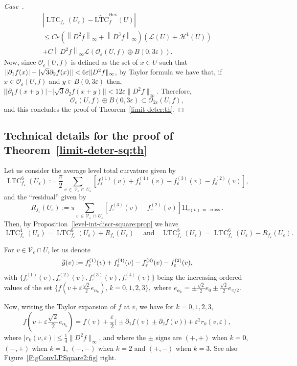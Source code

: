 \documentclass[AHL,Unicode,longabstracts,published]{cedram}
\newcommand{\ind}{{1\!\!\mathrm{I}}}
\newcommand{\eps}{\varepsilon}
\DeclareMathOperator{\LTC}{LTC}
\DeclareMathOperator{\Hex}{Hex}
\DeclareMathOperator{\cross}{cross}
\newcommand{\tLTC}{\widetilde{\mathrm{LTC}}}
\newcommand{\calH}{\mathcal{H}}
\newcommand{\calL}{\mathcal{L}}
\newcommand{\calV}{\mathcal{V}}
\newcommand{\calO}{\mathcal{O}}
\newcounter{casecount}
\newenvironment{lastcase}{\refstepcounter{casecount}\begin{proof}[Case~\thecasecount]}{\end{proof}}
\let\oldtilde\tilde
\renewcommand*{\tilde}[1]{\mathchoice{\widetilde{#1}}{\widetilde{#1}}{\oldtilde{#1}}{\oldtilde{#1}}}
\begin{document}
\begin{lastcase}
\begin{multline*}
\left|\LTC_{f_\eps}(U_\eps)-\tLTC_{f}^{\Hex}(U)\right|
\\
\le C\eps
\left(\left\|D^2f\right\|_\infty+\left\|D^3f\right\|_\infty\right)\left(\calL(U)+\calH^1(U)\right)\\+ C \left\|D^2f\right\|_\infty \calL\left(\calO_{\eps} (U,f)\oplus B(0,3\eps)\right).
\end{multline*}
Now, since ${\calO}_{\eps} (U,f)$ is defined as the set of $x\in U$ such that $| |\partial_1f(x)|-|\sqrt{3}\partial_2f(x)| | \linebreak <6\eps\|D^2 f\|_\infty$, by Taylor formula we have that, if $x\in {\calO}_{\eps} (U,f)$ and $y\in B(0,3\eps)$ then, $| |\partial_1f(x+y)|-|\sqrt{3}\partial_2f(x+y)| | <12\eps\|D^2 f\|_\infty$. Therefore,
\[
{\calO}_{\eps} (U,f) \oplus B(0,3\eps) \subset {\calO}_{2\eps} (U,f),
\]
and this concludes the proof of Theorem~\ref{limit-deter:th}.
\end{lastcase}

\subsection{Technical details for the proof of Theorem~\ref{limit-deter-sq:th}}\label{app:limit-deter-sq:th}

Let us consider the average level total curvature given by
\[
\LTC_{f_\eps}^6(U_\eps) := \frac{\pi}{2} \sum_{v\,\in\,\calV_\varepsilon\,\cap\,U_\eps} \left[f_\eps^{(1)}(v) + f_\eps^{(4)}(v) - f_\eps^{(3)}(v)
-f_\eps^{(2)}(v)\right],
\]
and the ``residual'' given by
\[
R_{f_\eps}(U_\eps) := \pi
\sum_{v\,\in\,\calV_\eps\,\cap\,U_\eps} \left[f_\eps^{(3)}(v) - f_\eps^{(2)}(v)\right]
\ind_{c(v)\,=\,\cross}.
\]
Then, by Proposition~\ref{level-int-discr-square:prop} we have
\[
\LTC^4_{f_\eps}(U_\eps) =\LTC^6_{f_\eps}(U_\eps)+ R_{f_\eps}(U_\eps)
\quad \text{ and
} \quad \LTC^8_{f_\eps}(U_\eps) =\LTC^6_{f_\eps}(U_\eps) - R_{f_\eps}(U_\eps).
\]


For $v\in\calV_\eps\cap U$, let us denote
\[
\tilde{g}(v) := f_\eps^{(1)}(v) + f_\eps^{(4)}(v) - f_\eps^{(3)}(v)
-f_\eps^{(2)}(v),
\]
with $\{ f_\eps^{(1)}(v), f_\eps^{(2)}(v), f_\eps^{(3)}(v), f_\eps^{(4)}(v) \}$ being the increasing ordered values of the set $\{ f(v +\eps\tfrac{\sqrt{2}}{2} e_{\alpha_k}), \, k=0,1,2,3 \},$ where $e_{\alpha_k}= \pm \tfrac{\sqrt{2}}{2} e_0 \pm \tfrac{\sqrt{2}}{2} e_{\pi/2}$.

Now, writing the Taylor expansion of $f$ at $v$, we have for $k=0,1,2,3$,
\begin{equation}\label{TaylorSq:eq}
f\left(v + \eps\frac{\sqrt{2}}{2} e_{\alpha_k}\right) = f(v) +
\frac{\eps}{2}\big(\pm\partial_1f(v) \pm\partial_2f(v)\big) + \eps^2 r_k(v,\eps),
\end{equation}
where $|r_k(v,\eps)|\leq \frac{1}{4} \|D^2 f\|_\infty$, and where the $\pm$ signs are $(+,+)$ when $k=0$,\linebreak$(-,+)$ when $k=1$, $(-,-)$ when $k=2$ and $(+,-)$ when $k=3$. See also Figure~\ref{FigConvLPSquare2:fig} right.
\end{document}
